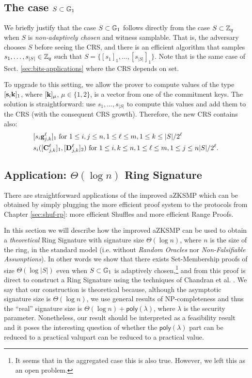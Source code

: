 \subsection{The case $S\subset\mathbb{G}_1$}
We briefly justify that the case $S\subset\mathbb{G}_1$ follows directly from the case $S\subset\mathbb{Z}_q$ when $S$ is \emph{non-adaptively chosen} and witness samplable. That is, the adversary chooses $S$ before seeing the CRS, and there is an efficient algorithm that samples $s_1,\ldots,s_{|S|}\in\mathbb{Z}_q$ such that $S=\{[s_1]_1,\ldots,[s_{|S|}]_1\}$. Note that is the same case of Sect. \ref{sec:bits-applications} where the CRS depends on set.

To upgrade to this setting, we allow the prover to compute values of the type $[\mathbf{s}_i\mathbf{k}]_1$, where $[\mathbf{k}]_\mu$, $\mu\in\{1,2\}$, is a vector from one of the commitment keys. The solution is straightforward: use $s_1,\ldots,s_{|S|}$ to compute this values and add them to the CRS (with the consequent CRS growth). Therefore, the new CRS contains also:
\begin{align*}
&[s_i\mathbf{g}_{j,k}^\ell]_1 \text{ for }1\leq i,j\leq n, 1\leq\ell\leq m, 1\leq k\leq |S|/2^\ell\\
& s_i([\mathbf{{C}}^\ell_{j,k}]_1,[\mathbf{{D}}_{j,k}^\ell]_2) \text{ for } 1\leq i,k\leq n, 1\leq\ell\leq m,1\leq j\leq n|S|/2^\ell.
\end{align*}

\subsection{Application: $\Theta(\log n)$ Ring Signature}
There are straightforward applications of the improved aZKSMP which can be obtained by simply plugging the more efficient proof system to the protocols from Chapter \ref{sec:shuf-rp}: more efficient Shuffles and more efficient Range Proofs.

In this section we will describe how the improved aZKSMP can be used to obtain a \emph{theoretical} Ring Signature with signature size $\Theta(\log n)$, where $n$ is the size of the ring, in the standard model (i.e. without \emph{Random Oracles} nor \emph{Non-Falsifiable Assumptions}). In other words we show that there exists Set-Membership proofs of size $\Theta(\log |S|)$ even when $S\subset \mathbb{G}_1$ is adaptively chosen,\footnote{It seems that in the aggregated case this is also true. However, we left this as an open problem.} and from this proof is direct to construct a Ring Signature using the techniques of Chandran et al. \cite{ICALP:ChanGroSah07}. We say that our construction is theoretical because, although the asymptotic signature size is $\Theta(\log n)$, we use general results of NP-completeness and thus the ``real'' signature size is $\Theta(\log n)+\mathsf{poly}(\lambda)$, where $\lambda$ is the security parameter. Nonetheless, our result should be interpreted as a feasibility result and it poses the interesting question of whether the $\mathsf{poly}(\lambda)$ part can be reduced to a practical valupart can be reduced to a practical value.
